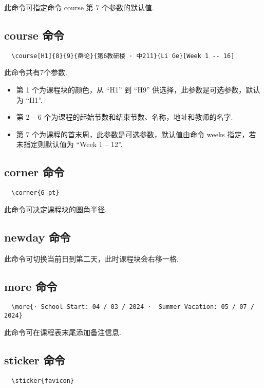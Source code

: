 \documentclass[11pt]{article}
\def\cmd#1{\texorpdfstring{\textcolor{cmdcolor}{\textsf{#1}}}{“#1”}}
\begin{document}
此命令可指定命令 \cmd{course} 第 7 个参数的默认值.

\subsection{\cmd{course} 命令}
\begin{verbatim}
  \course[H1]{8}{9}{群论}{第6教研楼 · 中211}{Li Ge}[Week 1 -- 16]
\end{verbatim}

此命令共有7个参数.
\begin{itemize}
  \item 第 1 个为课程块的颜色，从 ``H1'' 到 ``H9'' 供选择，此参数是可选参数，默认为 ``H1''.
  \item 第 2 -- 6 个为课程的起始节数和结束节数、名称，地址和教师的名字.
  \item 第 7 个为课程的首末周，此参数是可选参数，默认值由命令 \cmd{weeks} 指定，若未指定则默认值为 ``Week 1 -- 12''.
\end{itemize}

\subsection{\cmd{corner} 命令}
\begin{verbatim}
  \corner{6 pt}
\end{verbatim}

此命令可决定课程块的圆角半径.

\subsection{\cmd{newday} 命令}
此命令可切换当前日到第二天，此时课程块会右移一格.

\subsection{\cmd{more} 命令}
\begin{verbatim}
  \more{· School Start: 04 / 03 / 2024 ·  Summer Vacation: 05 / 07 / 2024}
\end{verbatim}

此命令可在课程表末尾添加备注信息.

\subsection{\cmd{sticker} 命令}
\begin{verbatim}
  \sticker{favicon}
\end{verbatim}
\end{document}

